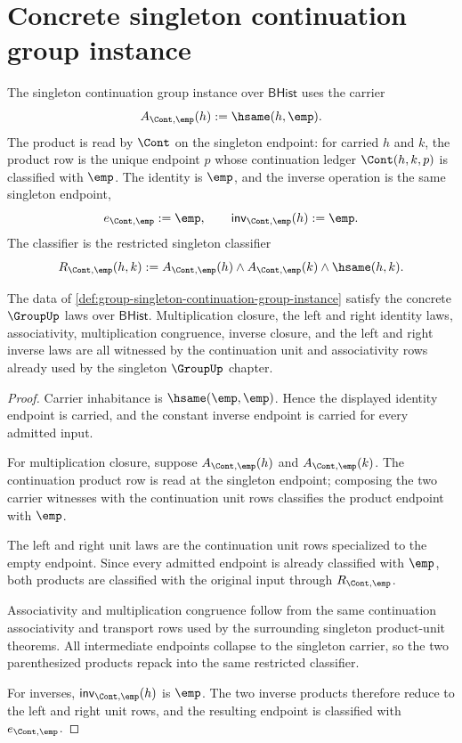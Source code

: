 \section{Concrete singleton continuation group instance}
\label{sec:group-singleton-continuation-group-instance}

\begin{definition}
\label{def:group-singleton-continuation-group-instance}
The singleton continuation group instance over $\mathsf{BHist}$ uses the carrier
$$
A_{\Cont,\emp}(h) := \hsame(h,\emp).
$$
The product is read by $\Cont$ on the singleton endpoint: for carried $h$ and $k$, the product row is the unique endpoint $p$ whose continuation ledger $\Cont(h,k,p)$ is classified with $\emp$. The identity is $\emp$, and the inverse operation is the same singleton endpoint,
$$
e_{\Cont,\emp}:=\emp,
\qquad
\mathsf{inv}_{\Cont,\emp}(h):=\emp.
$$
The classifier is the restricted singleton classifier
$$
R_{\Cont,\emp}(h,k) := A_{\Cont,\emp}(h)\land A_{\Cont,\emp}(k)\land \hsame(h,k).
$$
\end{definition}

\begin{theorem}
\label{thm:group-singleton-continuation-laws}
The data of \autoref{def:group-singleton-continuation-group-instance} satisfy the concrete $\GroupUp$ laws over $\mathsf{BHist}$. Multiplication closure, the left and right identity laws, associativity, multiplication congruence, inverse closure, and the left and right inverse laws are all witnessed by the continuation unit and associativity rows already used by the singleton $\GroupUp$ chapter.
\end{theorem}
\begin{proof}
Carrier inhabitance is $\hsame(\emp,\emp)$. Hence the displayed identity endpoint is carried, and the constant inverse endpoint is carried for every admitted input.

For multiplication closure, suppose $A_{\Cont,\emp}(h)$ and $A_{\Cont,\emp}(k)$. The continuation product row is read at the singleton endpoint; composing the two carrier witnesses with the continuation unit rows classifies the product endpoint with $\emp$.

The left and right unit laws are the continuation unit rows specialized to the empty endpoint. Since every admitted endpoint is already classified with $\emp$, both products are classified with the original input through $R_{\Cont,\emp}$.

Associativity and multiplication congruence follow from the same continuation associativity and transport rows used by the surrounding singleton product-unit theorems. All intermediate endpoints collapse to the singleton carrier, so the two parenthesized products repack into the same restricted classifier.

For inverses, $\mathsf{inv}_{\Cont,\emp}(h)$ is $\emp$. The two inverse products therefore reduce to the left and right unit rows, and the resulting endpoint is classified with $e_{\Cont,\emp}$.
\end{proof}

